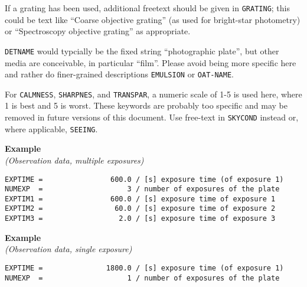 \documentclass[11pt]{ivoa}
\newcommand\cardname[1]{\texttt{\color{keyword}#1}}
\newenvironment{fitsexample}[1]
{\bigskip\noindent\textbf{Example}\\\textit{(#1)\smallskip}}
{\medskip}
\begin{document}
If a grating has been used, additional freetext should be given in
\cardname{GRATING}; this could be text like  ``Coarse objective
grating'' (as used for bright-star photometry) or ``Spectroscopy
objective grating'' as appropriate.

\cardname{DETNAME} would typcially be the fixed string ``photographic
plate'', but other media are conceivable, in particular ``film''.
Please avoid being more specific here and rather do finer-grained
descriptions \cardname{EMULSION} or \cardname{OAT-NAME}.

For \cardname{CALMNESS}, \cardname{SHARPNES}, and \cardname{TRANSPAR}, a
numeric scale of 1-5 is used here, where 1 is best and 5 is worst.
These keywords are probably too specific and may be removed in future
versions of this document.  Use free-text in \cardname{SKYCOND} instead
or, where applicable, \cardname{SEEING}.

\begin{fitsexample}{Observation data, multiple exposures}
\begin{lstlisting}
EXPTIME =                600.0 / [s] exposure time (of exposure 1)
NUMEXP  =                    3 / number of exposures of the plate
EXPTIM1 =                600.0 / [s] exposure time of exposure 1
EXPTIM2 =                 60.0 / [s] exposure time of exposure 2
EXPTIM3 =                  2.0 / [s] exposure time of exposure 3
\end{lstlisting}
\end{fitsexample}

\begin{fitsexample}{Observation data, single exposure}
\begin{lstlisting}
EXPTIME =               1800.0 / [s] exposure time (of exposure 1)
NUMEXP  =                    1 / number of exposures of the plate
\end{lstlisting}
\end{fitsexample}
\end{document}
